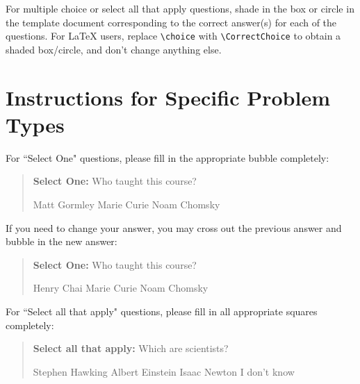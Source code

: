 \documentclass[11pt,addpoints,answers]{exam}
\newcommand{\blackcircle}{\tikz\draw[black,fill=black] (0,0) circle (1ex);}
\begin{document}

For multiple choice or select all that apply questions, shade in the box or circle in the template document corresponding to the correct answer(s) for each of the questions. For \LaTeX{} users, replace \lstinline{\choice} with \lstinline{\CorrectChoice} to obtain a shaded box/circle, and don't change anything else.\clearpage

\section*{Instructions for Specific Problem Types}

For ``Select One" questions, please fill in the appropriate bubble completely:

\begin{quote}
\textbf{Select One:} Who taught this course?
    \begin{checkboxes}
     \CorrectChoice Matt Gormley
     \choice Marie Curie
     \choice Noam Chomsky
    \end{checkboxes}
\end{quote}

If you need to change your answer, you may cross out the previous answer and bubble in the new answer:

\begin{quote}
\textbf{Select One:} Who taught this course?
    {
    \begin{checkboxes}
     \CorrectChoice Henry Chai
     \choice Marie Curie \checkboxchar{\xcancel{\blackcircle}{}}
     \choice Noam Chomsky
    \end{checkboxes}
    }
\end{quote}

For ``Select all that apply" questions, please fill in all appropriate squares completely:

\begin{quote}
\textbf{Select all that apply:} Which are scientists?
    {%
    \checkboxchar{$\Box$} \checkedchar{$\blacksquare$} %
    \begin{checkboxes}
    \CorrectChoice Stephen Hawking 
    \CorrectChoice Albert Einstein
    \CorrectChoice Isaac Newton
    \choice I don't know
    \end{checkboxes}
    }
\end{quote}
\end{document}
